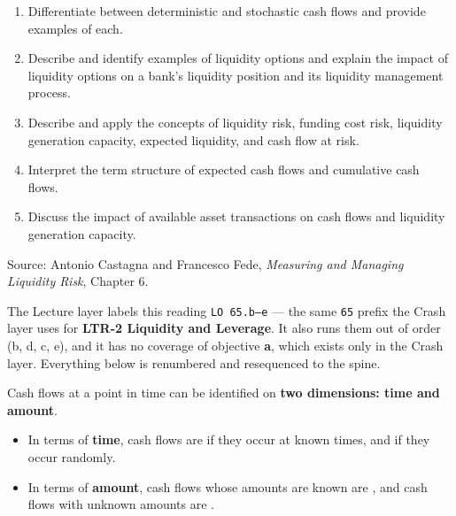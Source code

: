 
\begin{lrkeybox}
\begin{enumerate}[label=\textbf{\alph*.}]
\item Differentiate between deterministic and stochastic cash flows and provide examples of each.
\item Describe and identify examples of liquidity options and explain the impact of liquidity options on a bank's liquidity position and its liquidity management process.
\item Describe and apply the concepts of liquidity risk, funding cost risk, liquidity generation capacity, expected liquidity, and cash flow at risk.
\item Interpret the term structure of expected cash flows and cumulative cash flows.
\item Discuss the impact of available asset transactions on cash flows and liquidity generation capacity.
\end{enumerate}
{\footnotesize\color{FRMGrey}Source: Antonio Castagna and Francesco Fede, \textit{Measuring and Managing Liquidity Risk}, Chapter 6.}
\end{lrkeybox}

\begin{lrtrapbox}
The Lecture layer labels this reading \texttt{LO 65.b--e} --- the same \texttt{65} prefix the Crash layer uses for \textbf{LTR-2 Liquidity and Leverage}. It also runs them out of order (b, d, c, e), and it has no coverage of objective \textbf{a}, which exists only in the Crash layer. Everything below is renumbered and resequenced to the spine.
\end{lrtrapbox}


\begin{lrdefbox}
Cash flows at a point in time can be identified on \textbf{two dimensions: time and amount}.
\begin{itemize}
\item In terms of \textbf{time}, cash flows are  if they occur at known times, and  if they occur randomly.
\item In terms of \textbf{amount}, cash flows whose amounts are known are , and cash flows with unknown amounts are .
\end{itemize}
\end{lrdefbox}

